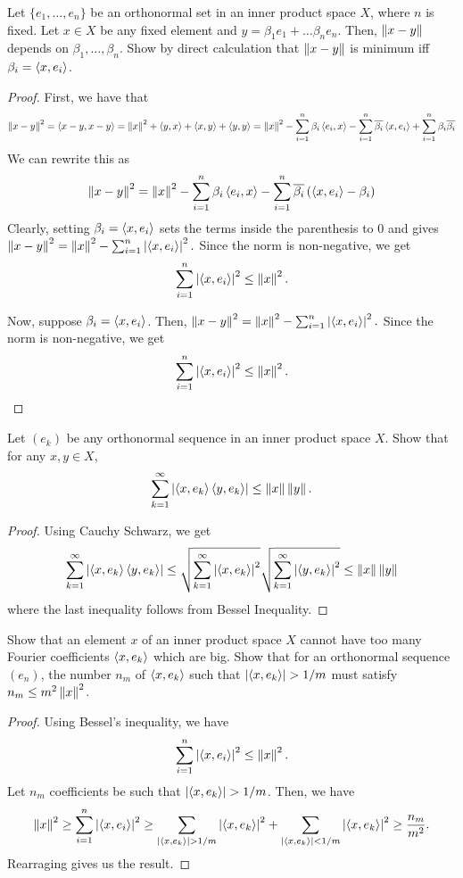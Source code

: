 \begin{question}
    Let $\{e_1 , \ldots , e_n\}$ be an orthonormal set in an inner product space $X$, where $n$ is fixed. Let $x \in X$ be any fixed element and $y = \beta_1 e_1 + \ldots \beta_n e_n$. Then, $\left\lVert x-y \right\rVert$ depends on $\beta_1 , \ldots , \beta_n$. Show by direct calculation that $\left\lVert x-y \right\rVert$ is minimum iff $\beta_i = \left\langle x , e_i \right\rangle$.
    \label{section3.4-6}
\end{question}
\begin{proof}
    First, we have that
    \[\left\lVert x-y \right\rVert^2 = \left\langle x-y , x-y \right\rangle = \left\lVert x \right\rVert^2 + \left\langle y , x \right\rangle + \left\langle x , y \right\rangle + \left\langle y , y \right\rangle = \left\lVert x \right\rVert^2 - \sum_{i=1}^n \beta_i \left\langle e_i , x \right\rangle - \sum_{i=1}^n \overline{\beta_i} \left\langle x , e_i \right\rangle + \sum_{i=1}^n \beta_i \overline{\beta_i}\]
    We can rewrite this as
    \[\left\lVert x-y \right\rVert^2 = \left\lVert x \right\rVert^2 - \sum_{i=1}^n \beta_i \left\langle e_i , x \right\rangle - \sum_{i=1}^n \overline{\beta_i} \left(\left\langle x , e_i \right\rangle - \beta_i \right)\]
    Clearly, setting $\beta_i = \left\langle x , e_i \right\rangle$ sets the terms inside the parenthesis to $0$ and gives $\left\lVert x-y \right\rVert^2 = \left\lVert x \right\rVert^2 - \sum_{i=1}^n \left\lvert \left\langle x , e_i \right\rangle \right\rvert^2.$ Since the norm is non-negative, we get
    \[\sum_{i=1}^n \left\lvert \left\langle x , e_i \right\rangle \right\rvert^2 \leq \left\lVert x \right\rVert^2.\]

    Now, suppose $\beta_i  =\left\langle x , e_i \right\rangle$. Then, $\left\lVert x-y \right\rVert^2 = \left\lVert x \right\rVert^2 - \sum_{i=1}^n \left\lvert \left\langle x , e_i \right\rangle \right\rvert^2.$ Since the norm is non-negative, we get
    \[\sum_{i=1}^n \left\lvert \left\langle x , e_i \right\rangle \right\rvert^2 \leq \left\lVert x \right\rVert^2.\]
\end{proof}

\begin{question}
   Let $(e_k)$ be any orthonormal sequence in an inner product space $X$. Show that for any $x ,y \in X$, 
   \[\sum_{k=1}^\infty \left\lvert \left\langle x , e_k \right\rangle\left\langle y , e_k \right\rangle \right\rvert \leq \left\lVert x \right\rVert\left\lVert y \right\rVert.\]
    \label{section3.4-7}
\end{question}
\begin{proof}
    Using Cauchy Schwarz, we get
    \[\sum_{k=1}^\infty \left\lvert \left\langle x , e_k \right\rangle\left\langle y , e_k \right\rangle \right\rvert \leq \sqrt{\sum_{k=1}^\infty \left\lvert \left\langle x , e_k \right\rangle \right\rvert^2} \sqrt{\sum_{k=1}^\infty \left\lvert \left\langle y , e_k \right\rangle \right\rvert^2} \leq \left\lVert x \right\rVert \left\lVert y \right\rVert\]
    where the last inequality follows from Bessel Inequality.
\end{proof}

\begin{question}
    Show that an element $x$ of an inner product space $X$ cannot have too many Fourier coefficients $\left\langle x , e_k \right\rangle$ which are big. Show that for an orthonormal sequence $(e_n)$, the number $n_m$ of $\left\langle x , e_k \right\rangle$ such that $\left\lvert \left\langle x , e_k \right\rangle \right\rvert > 1/m$ must satisfy $n_m \leq m^2 \left\lVert x \right\rVert^2$.
    \label{section3.4-8}
\end{question}
\begin{proof}
    Using Bessel's inequality, we have
    \[\sum_{i=1}^n \left\lvert \left\langle x , e_i \right\rangle \right\rvert^2 \leq \left\lVert x \right\rVert^2.\]
    Let $n_m$ coefficients be such that $\left\lvert \left\langle x , e_k \right\rangle \right\rvert > 1/m$. Then, we have
    \[\left\lVert x \right\rVert^2 \geq \sum_{i=1}^n \left\lvert \left\langle x , e_i \right\rangle \right\rvert^2 \geq \sum_{\left\lvert \left\langle x , e_k \right\rangle \right\rvert > 1/m} \left\lvert \left\langle x , e_k \right\rangle \right\rvert^2 + \sum_{\left\lvert \left\langle x , e_k \right\rangle \right\rvert < 1/m} \left\lvert \left\langle x , e_k \right\rangle \right\rvert^2 \geq \frac{n_m}{m^2}.\]
    Rearraging gives us the result.
\end{proof}

